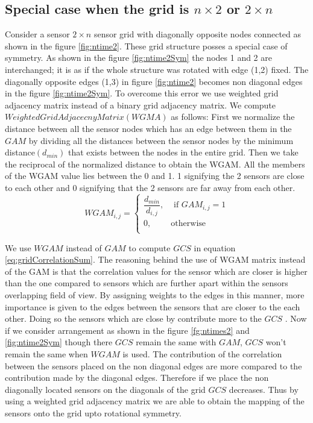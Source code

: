 \subsection{Special case when the grid is $n \times 2$ or $2 \times n$}
Consider a sensor $2 \times n$ sensor grid with diagonally opposite nodes connected as shown in the figure \ref{fig:ntime2}. These grid structure posses a special case of symmetry. As shown in the  figure \ref{fig:ntime2Sym} the nodes 1 and 2 are interchanged; it is as if the whole structure was rotated with  edge (1,2) fixed. The diagonally opposite edges (1,3) in figure \ref{fig:ntime2} becomes non diagonal edges in the figure \ref{fig:ntime2Sym}. To overcome this error we use weighted grid adjacency matrix instead of a binary grid adjacency matrix. We compute $Weighted Grid Adjacecny Matrix (WGMA)$ as follows:
First we normalize the distance between all the sensor nodes which has an edge between them in the $GAM$ by dividing all the distances between the sensor nodes by the minimum distance$(d_{min})$ that exists between the nodes in the entire grid. Then we take the reciprocal of the normalized distance to obtain the WGAM. All the members of the WGAM value lies between the 0 and 1. 1 signifying the 2 sensors are close to each other and 0 signifying that the 2 sensors are far away from each other.\\
\[
WGAM_{i,j} = 
\begin{cases}
\dfrac{d_{min}}{d_{i,j}}, &\text{ if } GAM_{i,j} = 1\\
0, & \text{otherwise}\\
\end{cases}
\]


We use $WGAM$ instead of $GAM$ to compute $GCS$ in equation \ref{eq:gridCorrelationSum}. The reasoning behind the use of WGAM matrix instead of the GAM is that the correlation values for the sensor which are closer is higher than the one compared to sensors which are further apart within the sensors overlapping field of view. By assigning weights to the edges in this manner, more importance is given to the edges between the sensors that are closer to the each other. Doing so the sensors which are close by contribute  more to the $GCS$ . 
Now if we consider arrangement as shown in the figure \ref{fg:ntimes2} and \ref{fig:ntime2Sym} though there $GCS$ remain the same with $GAM$, $GCS$ won't remain the same when $WGAM$ is used. The contribution of the correlation between the sensors placed on the non diagonal edges are more compared to the contribution made by the diagonal edges. Therefore if we place the non diagonally located sensors on the diagonals of the grid $GCS$ decreases. Thus by using a weighted grid adjacency matrix we are able to obtain the mapping of the sensors onto the grid upto rotational symmetry.

